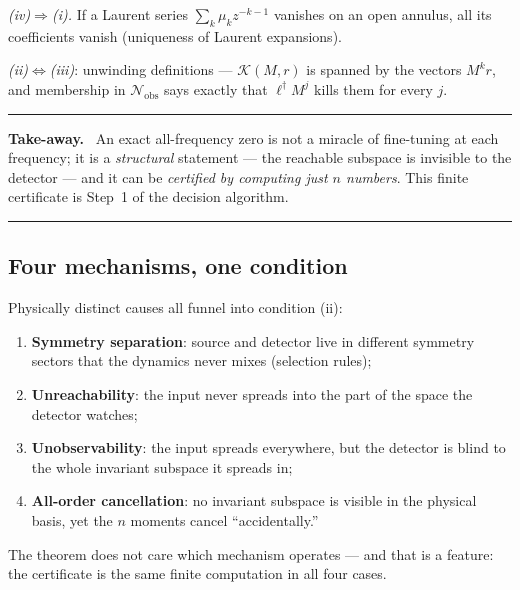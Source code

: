 \documentclass[11pt]{article}
\newcommand{\kry}{\mathcal K}
\newcommand{\nobs}{\mathcal N_{\mathrm{obs}}}
\newenvironment{takeaway}
  {\par\medskip\noindent
   \begin{center}\begin{minipage}{0.92\textwidth}
   \hrule\medskip\noindent\textbf{Take-away.}\ }
  {\medskip\hrule\end{minipage}\end{center}\medskip}
\begin{document}
\emph{(iv)$\Rightarrow$(i).}  If a Laurent series
$\sum_k\mu_k z^{-k-1}$ vanishes on an open annulus, all its coefficients
vanish (uniqueness of Laurent expansions).

\emph{(ii)$\Leftrightarrow$(iii)}: unwinding definitions --- $\kry(M,r)$ is
spanned by the vectors $M^k r$, and membership in $\nobs$ says exactly that
$\ell^\dagger M^j$ kills them for every $j$.

\begin{takeaway}
An exact all-frequency zero is not a miracle of fine-tuning at each
frequency; it is a \emph{structural} statement --- the reachable subspace is
invisible to the detector --- and it can be \emph{certified by computing just
$n$ numbers}.  This finite certificate is Step~1 of the decision algorithm.
\end{takeaway}

\subsection{Four mechanisms, one condition}

Physically distinct causes all funnel into condition (ii):
\begin{enumerate}
\item \textbf{Symmetry separation}: source and detector live in different
symmetry sectors that the dynamics never mixes (selection rules);
\item \textbf{Unreachability}: the input never spreads into the part of the
space the detector watches;
\item \textbf{Unobservability}: the input spreads everywhere, but the
detector is blind to the whole invariant subspace it spreads in;
\item \textbf{All-order cancellation}: no invariant subspace is visible in
the physical basis, yet the $n$ moments cancel ``accidentally.''
\end{enumerate}
The theorem does not care which mechanism operates --- and that is a feature:
the certificate is the same finite computation in all four cases.
\end{document}
